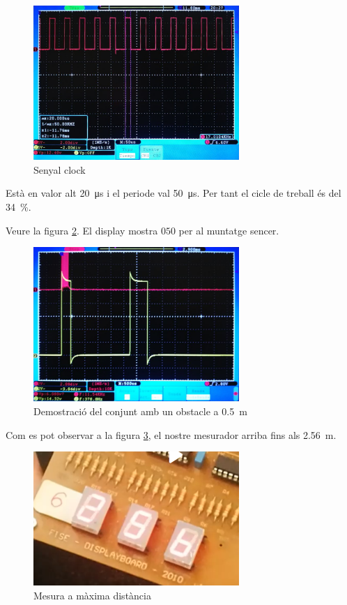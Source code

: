 \documentclass[catalan, a4paper, nobib]{tufte-handout}
\begin{document}
\begin{figure}
  \begin{center}
    \includegraphics[width=295px]{3_2.png}
  \end{center}
  \caption{Senyal clock}
  \label{fig:3_2}
\end{figure}

 Està en valor alt \qty{20}{\micro\second} i el periode val \qty{50}{\micro\second}. Per tant el cicle de treball és del \qty{34}{\percent}.

 Veure la figura \ref{fig:3_4}. El display mostra $050$ per al muntatge sencer.

\begin{figure}
  \begin{center}
    \includegraphics[width=295px]{3_4.png}
  \end{center}
  \caption{Demostració del conjunt amb un obstacle a \qty{0.5}{\meter}}
  \label{fig:3_4}
\end{figure}

 Com es pot observar a la figura \ref{fig:3_5}, el nostre mesurador arriba fins als \qty{2.56}{\meter}.

\begin{figure}
  \begin{center}
    \includegraphics[width=295px]{3_5.png}
  \end{center}
  \caption{Mesura a màxima distància}
  \label{fig:3_5}
\end{figure}


\end{document}
